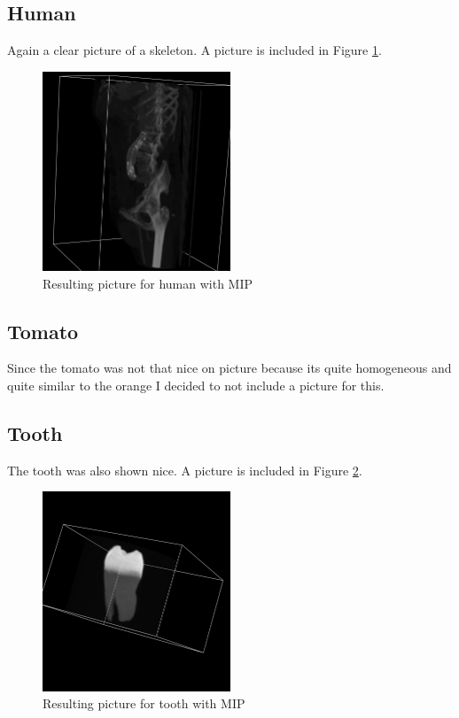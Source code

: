 \documentclass[a4paper,twoside,11pt]{article}
\begin{document}
\subsection{Human}
Again a clear picture of a skeleton. A picture is included in Figure \ref{MH}.
\begin{figure}[!h]
  \centering
  \includegraphics[width=0.5\textwidth]{MH.png}
  \caption{Resulting picture for human with MIP}
  \label{MH}
\end{figure}

\subsection{Tomato}
Since the tomato was not that nice on picture because its quite homogeneous and quite similar to the orange I decided to not include a picture for this.

\subsection{Tooth}
The tooth was also shown nice. A picture is included in Figure \ref{MT}.
\begin{figure}[!h]
  \centering
  \includegraphics[width=0.5\textwidth]{MT.png}
  \caption{Resulting picture for tooth with MIP}
  \label{MT}
\end{figure}
\end{document}

